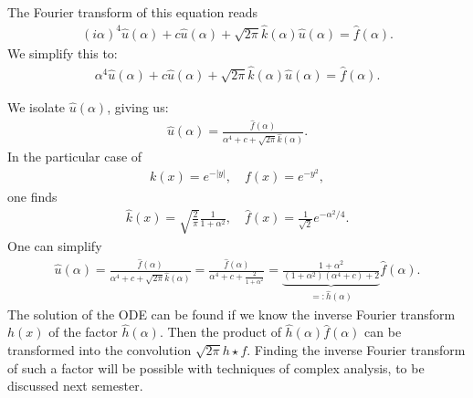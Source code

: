 \documentclass[11pt]{article}
\begin{document}
\begin{solution}
    The Fourier transform of this equation reads
    \begin{align}
        (i\alpha)^{4} \hat u(\alpha) + c \hat u(\alpha) + \sqrt{2\pi} \hat k(\alpha) \hat u(\alpha) = \hat f(\alpha)
        .
    \end{align}
    We simplify this to:
    \begin{align}
        \alpha^{4} \hat u(\alpha) + c \hat u(\alpha) + \sqrt{2\pi} \hat k(\alpha) \hat u(\alpha) = \hat f(\alpha)
        .
    \end{align}
    
    We isolate $\hat u(\alpha)$, giving us:
    \begin{align}
        \hat u(\alpha)
        =
        \frac{\hat f(\alpha)}{ \alpha^{4} + c + \sqrt{2\pi} \hat k(\alpha) }
        .
    \end{align}
    In the particular case of 
    \begin{align}
        k(x) = e^{-|y|},
        \quad 
        f(x) = e^{-y^{2}},
    \end{align}
    one finds
    \begin{align}
        \hat k(x) = \sqrt{\frac{2}{\pi}} \frac{1}{1 + \alpha^{2}},
        \quad 
        \hat f(x) = \frac{1}{\sqrt{2}} e^{-\alpha^{2}/4}.
    \end{align}
    One can simplify
    \begin{align}
        \hat u(\alpha)
        =
        \frac{\hat f(\alpha)}{ \alpha^{4} + c + \sqrt{2\pi} \hat k(\alpha) }
        =
        \frac{\hat f(\alpha)}{ \alpha^{4} + c + \frac{2}{1 + \alpha^{2}} }
        =
        \underbrace{ \frac{ 1 + \alpha^{2} }{ ( 1 + \alpha^{2} )( \alpha^{4} + c ) + 2 } }_{ =: \hat h(\alpha) }
        \hat f(\alpha)
        .
    \end{align}
    The solution of the ODE can be found if we know the inverse Fourier transform $h(x)$ of the factor $\hat h(\alpha)$.
    Then the product of $\hat h(\alpha) \hat f(\alpha)$ can be transformed into the convolution $\sqrt{2\pi} h \star f$. 
    Finding the inverse Fourier transform of such a factor will be possible with techniques of complex analysis, 
    to be discussed next semester. 
\end{solution}
\end{document}
